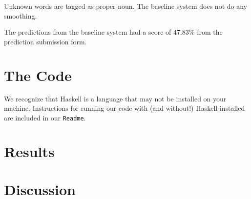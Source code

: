 \documentclass{article}
\begin{document}
Unknown words are tagged as proper noun.
The baseline system does not do any smoothing.

The predictions from the baseline system had a score of 47.83\%
from the prediction submission form.


\section{The Code}

We recognize that Haskell is a language that may not be installed on your
machine.  Instructions for running our code with (and without!) Haskell
installed are included in our \verb+Readme+.

\section{Results}


\section{Discussion}
\end{document}
